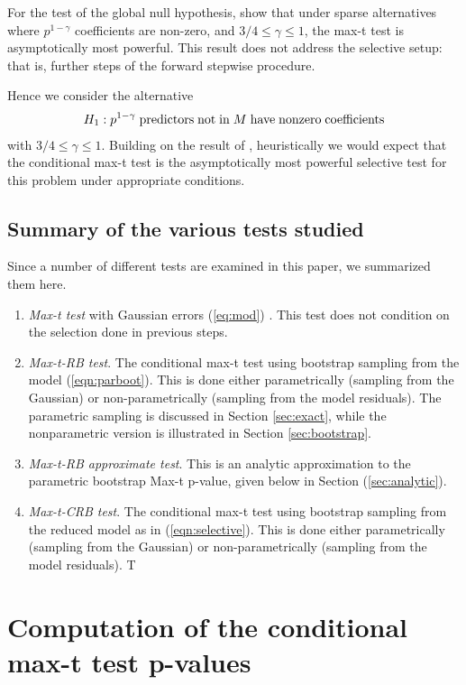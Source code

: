 \documentclass{article}
\begin{document}
For the test of the global null hypothesis, \citet{ACP2012}  show that under sparse alternatives where $p^{1-\gamma}$ coefficients are non-zero, and $3/4 \leq \gamma \leq 1$,
the max-t  test is asymptotically most powerful. This result does not address the selective  setup: that is, further steps of the forward stepwise procedure.

Hence we consider the alternative
\begin{eqnarray}
H_1: p^{1-\gamma}\;{\rm predictors}\; {\rm not}\;{\rm in}\; M\;{\rm  have}\; {\rm  nonzero}\;{\rm coefficients}
\end{eqnarray}
with $3/4 \leq \gamma \leq 1$.
Building on the result of \citet{ACP2012}, heuristically we would expect that  the conditional max-t test is the asymptotically most powerful selective test for this problem under appropriate conditions.
\subsection{Summary of the various tests studied}

Since a number of different tests are examined in this paper, we summarized them here.
\begin{enumerate}
\item {\em Max-t test} with Gaussian errors (\ref{eq:mod}) . This test does not condition on the selection done in previous steps.
\item {\em Max-t-RB test}. The conditional max-t test using bootstrap  sampling from the  model (\ref{eqn:parboot}).  This is done either parametrically (sampling from the Gaussian)
or non-parametrically (sampling from the model residuals).  The parametric sampling is discussed in Section \ref{sec:exact}, while 
the nonparametric version is illustrated in Section \ref{sec:bootstrap}.
\item {\em Max-t-RB approximate test}. 
 This is an analytic approximation to the  parametric bootstrap Max-t p-value, given below in Section (\ref{sec:analytic}).
\item {\em Max-t-CRB test}. The conditional max-t test using bootstrap  sampling from the reduced model as in (\ref{eqn:selective}).  This is done either parametrically (sampling from the Gaussian)
or non-parametrically (sampling from the model residuals).  T
\end{enumerate}

\section{Computation of the conditional max-t test p-values}
\end{document}
